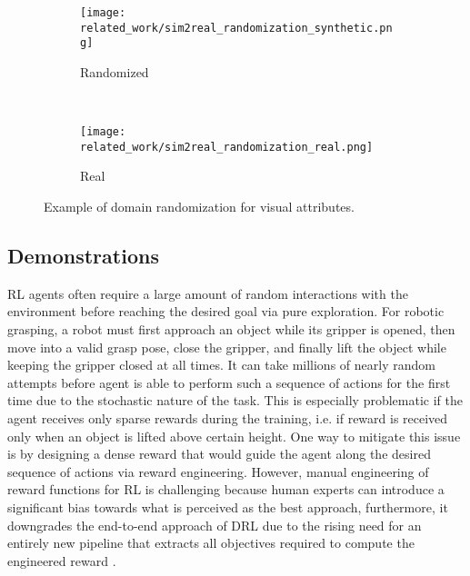\begin{figure}[ht]
    \centering
    \begin{subfigure}[ht]{0.745\textwidth}
        \centering
        \texttt{[image: related\_work/sim2real\_randomization\_synthetic.png]}
        \caption*{Randomized}
    \end{subfigure}%
    ~
    \begin{subfigure}[ht]{0.245\textwidth}
        \centering
        \texttt{[image: related\_work/sim2real\_randomization\_real.png]}
        \caption*{Real}
    \end{subfigure}%
    \caption{Example of domain randomization for visual attributes.~\protect\cite{tobin_domain_2017}}
    \label{fig:sim2real_domain_randomization}
\end{figure}


\subsection{Demonstrations}

RL agents often require a large amount of random interactions with the environment before reaching the desired goal via pure exploration. For robotic grasping, a robot must first approach an object while its gripper is opened, then move into a valid grasp pose, close the gripper, and finally lift the object while keeping the gripper closed at all times. It can take millions of nearly random attempts before agent is able to perform such a sequence of actions for the first time due to the stochastic nature of the task. This is especially problematic if the agent receives only sparse rewards during the training, i.e. if reward is received only when an object is lifted above certain height. One way to mitigate this issue is by designing a dense reward that would guide the agent along the desired sequence of actions via reward engineering. However, manual engineering of reward functions for RL is challenging because human experts can introduce a significant bias towards what is perceived as the best approach, furthermore, it downgrades the end-to-end approach of DRL due to the rising need for an entirely new pipeline that extracts all objectives required to compute the engineered reward \cite{singh_end--end_2019}.

